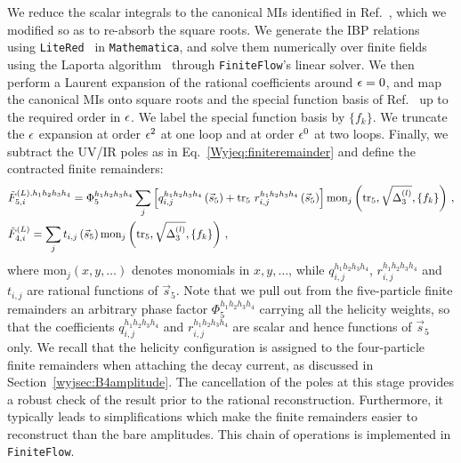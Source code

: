 \documentclass[main.tex]{subfiles}
\begin{document}
We reduce the scalar integrals to the canonical MIs identified in Ref.~\cite{Abreu:2020jxa}, which we modified so as to re-absorb the square roots. We generate the IBP relations~\cite{Chetyrkin:1981qh} using \texttt{LiteRed}~\cite{Lee:2012cn} in \texttt{Mathematica}, and solve them numerically over finite fields using the Laporta algorithm~\cite{Laporta:2000dsw} through \texttt{FiniteFlow}'s linear solver. We then perform a Laurent expansion of the rational coefficients around $\epsilon=0$, and map the canonical MIs onto square roots and the special function basis of  Ref.~\cite{Badger:2021nhg} up to the required order in $\epsilon$. We label the special function basis by $\{f_k\}$. We truncate the $\epsilon$ expansion at order $\epsilon^2$ at one loop and at order $\epsilon^0$ at two loops. Finally, we subtract the UV/IR poles as in Eq.~\ref{Wyjeq:finiteremainder} and define the contracted finite remainders:
\begin{align} \label{Wyjeq:finrem_ratcoeffs}
& \tilde{F}_{5,i}^{(L), h_1h_2h_3h_4} = \Phi^{h_1h_2h_3h_4}_{5} \sum_j \left[ q_{i,j}^{h_1h_2h_3h_4}\left(\vec{s}_5\right) + \operatorname{\rm tr}_5 \, r_{i,j}^{h_1h_2h_3h_4} \left(\vec{s}_5\right) \right] \text{mon}_j\left(\operatorname{\rm tr}_5,\sqrt{\Delta_3^{(l)}}, \{f_k\} \right) \,, \nonumber \\
& \tilde{F}_{4,i}^{(L)} = \sum_j t_{i,j}\left(\vec{s}_5\right) \text{mon}_j\left(\operatorname{\rm tr}_5,\sqrt{\Delta_3^{(l)}}, \{f_k\} \right) \,,
\end{align}
where $\text{mon}_j(x,y,\ldots)$ denotes monomials in $x,y,\ldots$, while $q_{i,j}^{h_1h_2h_3h_4}$, $r_{i,j}^{h_1h_2h_3h_4}$ and $t_{i,j}$ are rational functions of $\vec{s}_5$. Note that we pull out from the five-particle finite remainders an arbitrary phase factor $\Phi^{h_1h_2h_3h_4}_{5}$ carrying all the helicity weights, so that the coefficients $q_{i,j}^{h_1h_2h_3h_4}$ and $r_{i,j}^{h_1h_2h_3h_4}$ are scalar and hence functions of $\vec{s}_5$ only. We recall that the helicity configuration is assigned to the four-particle finite remainders when attaching the decay current, as discussed in Section~\ref{wyjsec:B4amplitude}. The cancellation of the poles at this stage provides a robust check of the result prior to the rational reconstruction. Furthermore, it typically leads to simplifications which make the finite remainders easier to reconstruct than the bare amplitudes. This chain of operations is implemented in \texttt{FiniteFlow}.
\end{document}
